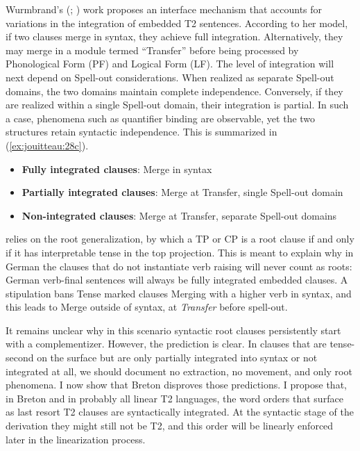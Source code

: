 \documentclass[output=paper,colorlinks,citecolor=brown]{langscibook}
\begin{document}
Wurmbrand's (\citeyear{mj:Wurmbrand2012}; \citeyear{mj:Wurmbrand2014}) work proposes an interface mechanism that accounts for variations in the integration of embedded T2 sentences. According to her model, if two clauses merge in syntax, they achieve full integration. Alternatively, they may merge in a module termed “Transfer” before being processed by Phonological Form (PF) and Logical Form (LF). The level of integration will next depend on Spell-out considerations. When realized as separate Spell-out domains, the two domains maintain complete independence. Conversely, if they are realized within a single Spell-out domain, their integration is partial. In such a case, phenomena such as quantifier binding are observable, yet the two structures retain syntactic independence. This is summarized in (\ref{ex:jouitteau:28c}).

\ea \label{ex:jouitteau:28c}
\begin{itemize}
    \item {\textbf{Fully integrated clauses}: Merge in syntax}
    \item {\textbf{Partially integrated clauses}: Merge at Transfer, single Spell-out domain}
    \item {\textbf{Non-integrated clauses}: Merge at Transfer, separate Spell-out domains}
\end{itemize}
\z

\citet{mj:Wurmbrand2014} relies on the root generalization, by which a TP or CP is a root clause if and only if it has interpretable tense in the top projection. This is meant to explain why in German the clauses that do not instantiate verb raising will never count as roots: German verb-final sentences will always be fully integrated embedded clauses. A stipulation bans Tense marked clauses Merging with a higher verb in syntax, and this leads to Merge outside of syntax, at \textit{Transfer} before spell-out.  

It remains unclear why in this scenario syntactic root clauses persistently start with a complementizer. However, the prediction is clear. In clauses that are tense-second on the surface but are only partially integrated into syntax or not integrated at all, we should document no extraction, no movement, and only root phenomena. I now show that Breton disproves those predictions. I propose that, in Breton and in probably all linear T2 languages, the word orders that surface as last resort T2 clauses are syntactically integrated. At the syntactic stage of the derivation they might still not be T2, and this order will be linearly enforced later in the linearization process. 
\end{document}
